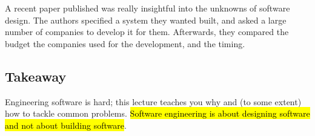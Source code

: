 \documentclass[english]{scrartcl}
\begin{document}
\begin{anmerkung}
A recent paper published was really insightful into the unknowns of software design. The authors specified a system they wanted built, and asked a large number of companies to develop it for them. Afterwards, they compared the budget the companies used for the development, and the timing.

\end{anmerkung}


\subsection{Takeaway}

Engineering software is hard; this lecture teaches you why and (to some extent) how to tackle common problems.
\hl{Software engineering is about designing software and not about building software}.
\end{document}

